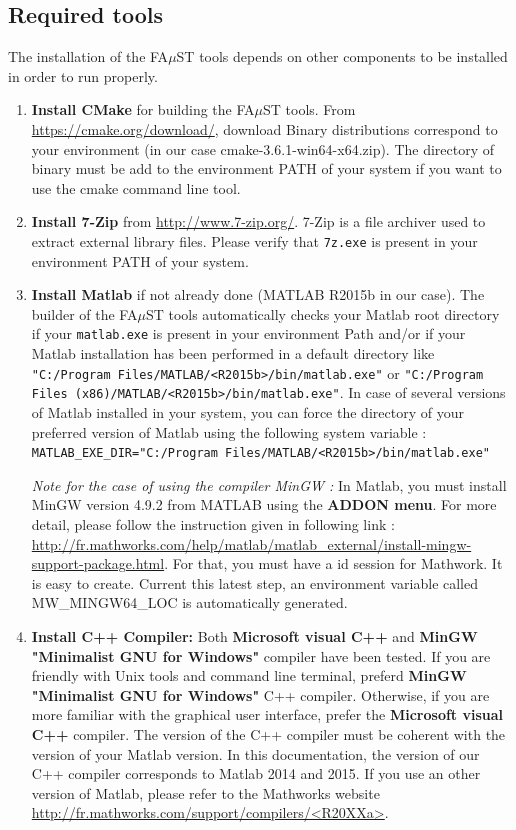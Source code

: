 \subsection{Required tools}\label{sec:WinRequired}
The installation of the FA$\mu$ST tools depends on other components to be installed in order to run properly. 
\begin{enumerate}

\item \textbf{Install CMake} for building the FA$\mu$ST tools. 
From \url{https://cmake.org/download/}, download Binary distributions correspond to your environment (in our case  cmake-3.6.1-win64-x64.zip). The directory of binary must be add to the environment PATH of your system if you want to use the cmake command line tool. 

\item \textbf{Install 7-Zip} from \url{http://www.7-zip.org/}. 7-Zip is a file archiver used to extract external library files. Please verify that \texttt{7z.exe} is present in your environment PATH of your system.

\item \textbf{Install Matlab} if not already done (MATLAB R2015b in our case). The builder of the FA$\mu$ST tools automatically checks your Matlab root directory if your \texttt{matlab.exe} is present in your environment Path and/or if your Matlab installation has been performed in a default directory like \texttt{"C:/Program Files/MATLAB/<R2015b>/bin/matlab.exe"} or \texttt{"C:/Program Files (x86)/MATLAB/<R2015b>/bin/matlab.exe"}. In case of several versions of Matlab installed in your system, you can force the directory of your preferred version of Matlab using the following system variable : \\
\texttt{MATLAB\_EXE\_DIR="C:/Program Files/MATLAB/<R2015b>/bin/matlab.exe"}

\textit{Note for the case of using the compiler MinGW :} In Matlab, you must install MinGW version 4.9.2 from MATLAB using the \textbf{ADDON menu}. For more detail, please follow the instruction given in following link :  
\url{http://fr.mathworks.com/help/matlab/matlab_external/install-mingw-support-package.html}. For that, you must have a id session for Mathwork. It is easy to create. 
Current this latest step, an environment variable called MW\_MINGW64\_LOC is automatically generated. 

\item \textbf{Install C++ Compiler:} Both \textbf{Microsoft visual C++} and \textbf{MinGW "Minimalist GNU for Windows"} compiler have been tested. If you are friendly with Unix tools and command line terminal, preferd \textbf{MinGW "Minimalist GNU for Windows"} C++ compiler. Otherwise, if you are more familiar with the graphical user interface, prefer the \textbf{Microsoft visual C++} compiler. The version of the C++ compiler must be coherent with the version of your Matlab version. In this documentation, the version of our C++ compiler corresponds to Matlab 2014 and 2015. If you use an other version of Matlab, please refer to the Mathworks website \url{http://fr.mathworks.com/support/compilers/<R20XXa>}.


\end{enumerate}
